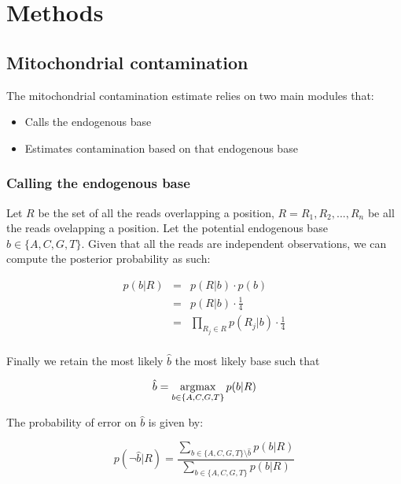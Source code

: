 \documentclass[a4paper,12pt]{article}
\newcommand{\argmax}{\operatornamewithlimits{argmax}}
\begin{document}
\section{Methods}


\subsection{Mitochondrial contamination}

The mitochondrial contamination estimate relies on two main modules that:

\begin{itemize}
\item Calls the endogenous base
\item Estimates contamination based on that endogenous base
\end{itemize}





\subsubsection{Calling the endogenous base}

\noindent Let $R$ be the set of all the reads overlapping a position, $R={R_1,R_2,...,R_n}$ be all the reads ovelapping a position.  Let the potential endogenous base $b\in\{A,C,G,T\}$. Given that all the reads are independent observations, we can compute the posterior probability as such:

\begin{eqnarray}
  p(b|R)   & = & p(R|b) \cdot p(b)  \\
           & = & p(R|b) \cdot \frac {1} {4} \\
           & = & \prod_{R_j \in R} p(R_j|b) \cdot \frac {1} {4} \\
\end{eqnarray} 



\noindent  Finally we retain the most likely $\hat{b}$ the most likely base such that 

\begin{equation}
\hat{b} = \argmax_{b \in \{A,C,G,T\} }   p(b|R)
\end{equation} 


\noindent  The probability of error on $\hat{b}$ is given by:

\begin{equation}
p(\neg \hat{b}|R) = \frac { \sum\limits_{ b \in \{A,C,G,T\}  \setminus \hat{b} } p(b|R) } { \sum\limits_{ b \in \{A,C,G,T\}  } p(b|R) }
\label{errormt}
\end{equation}
 
\end{document}
